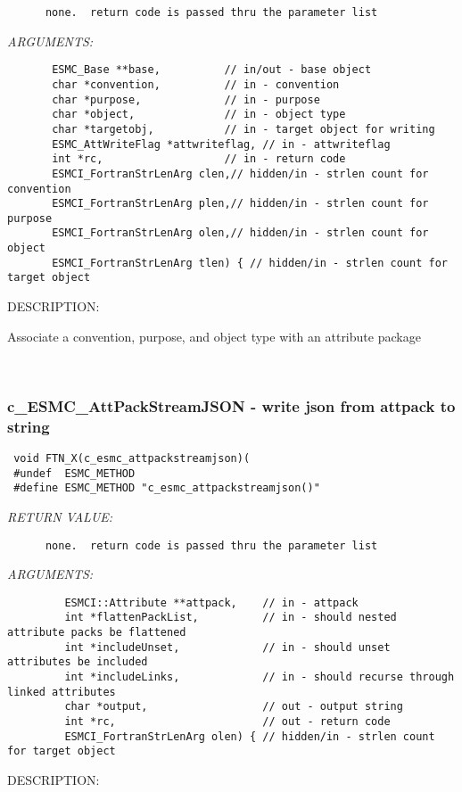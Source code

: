\begin{verbatim}      none.  return code is passed thru the parameter list
   \end{verbatim}{\em ARGUMENTS:}
\begin{verbatim}       ESMC_Base **base,          // in/out - base object
       char *convention,          // in - convention
       char *purpose,             // in - purpose
       char *object,              // in - object type
       char *targetobj,           // in - target object for writing
       ESMC_AttWriteFlag *attwriteflag, // in - attwriteflag
       int *rc,                   // in - return code
       ESMCI_FortranStrLenArg clen,// hidden/in - strlen count for convention
       ESMCI_FortranStrLenArg plen,// hidden/in - strlen count for purpose
       ESMCI_FortranStrLenArg olen,// hidden/in - strlen count for object
       ESMCI_FortranStrLenArg tlen) { // hidden/in - strlen count for target object
   \end{verbatim}
{\sf DESCRIPTION:\\ }


       Associate a convention, purpose, and object type with an attribute package
   
 
\mbox{}\hrulefill\ 
 
\subsubsection [c\_ESMC\_AttPackStreamJSON] {c\_ESMC\_AttPackStreamJSON - write json from attpack to string}


  
\begin{verbatim} void FTN_X(c_esmc_attpackstreamjson)(
 #undef  ESMC_METHOD
 #define ESMC_METHOD "c_esmc_attpackstreamjson()"\end{verbatim}{\em RETURN VALUE:}
\begin{verbatim}      none.  return code is passed thru the parameter list\end{verbatim}{\em ARGUMENTS:}
\begin{verbatim}         ESMCI::Attribute **attpack,    // in - attpack
         int *flattenPackList,          // in - should nested attribute packs be flattened
         int *includeUnset,             // in - should unset attributes be included
         int *includeLinks,             // in - should recurse through linked attributes
         char *output,                  // out - output string
         int *rc,                       // out - return code
         ESMCI_FortranStrLenArg olen) { // hidden/in - strlen count for target object\end{verbatim}
{\sf DESCRIPTION:\\ }


